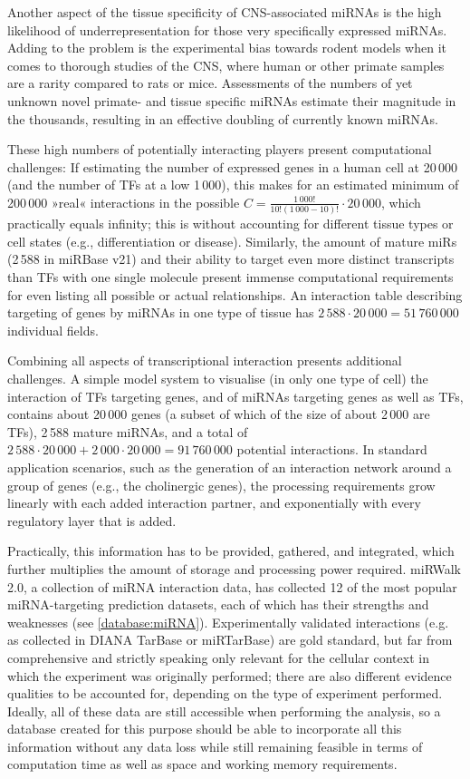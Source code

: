 Another aspect of the tissue specificity of CNS-associated miRNAs is the high likelihood of underrepresentation for those very specifically expressed miRNAs. Adding to the problem is the experimental bias towards rodent models when it comes to thorough studies of the CNS, where human or other primate samples are a rarity compared to rats or mice. Assessments of the numbers of yet unknown novel primate- and tissue specific miRNAs estimate their magnitude in the thousands\cite{Londin2015}, resulting in an effective doubling of currently known miRNAs.

These high numbers of potentially interacting players present computational challenges: If estimating the number of expressed genes in a human cell at 20\,000 (and the number of TFs at a low 1\,000), this makes for an estimated minimum of 200\,000 »real« interactions in the possible $ C = \frac{1\,000!}{10!(1\,000-10)!} \cdot 20\,000 $, which practically equals infinity; this is without accounting for different tissue types or cell states (e.g., differentiation or disease). Similarly, the amount of mature miRs (2\,588 in miRBase v21) and their ability to target even more distinct transcripts than TFs with one single molecule present immense computational requirements for even listing all possible or actual relationships. An interaction table describing targeting of genes by miRNAs in one type of tissue has $ 2\,588 \cdot 20\,000 = 51\,760\,000 $ individual fields.

Combining all aspects of transcriptional interaction presents additional challenges. A simple model system to visualise (in only one type of cell) the interaction of TFs targeting genes, and of miRNAs targeting genes as well as TFs, contains about 20\,000 genes (a subset of which of the size of about 2\,000 are TFs), 2\,588 mature miRNAs, and a total of $ 2\,588 \cdot 20\,000 + 2\,000 \cdot 20\,000 = 91\,760\,000 $ potential interactions. In standard application scenarios, such as the generation of an interaction network around a group of genes (e.g., the cholinergic genes), the processing requirements grow linearly with each added interaction partner, and exponentially with every regulatory layer that is added. 

Practically, this information has to be provided, gathered, and integrated, which further multiplies the amount of storage and processing power required. miRWalk 2.0, a collection of miRNA interaction data, has collected 12 of the most popular miRNA-targeting prediction datasets, each of which has their strengths and weaknesses (see \ref{database:miRNA}). Experimentally validated interactions (e.g. as collected in DIANA TarBase or miRTarBase) are gold standard, but far from comprehensive and strictly speaking only relevant for the cellular context in which the experiment was originally performed; there are also different evidence qualities to be accounted for, depending on the type of experiment performed. Ideally, all of these data are still accessible when performing the analysis, so a database created for this purpose should be able to incorporate all this information without any data loss while still remaining feasible in terms of computation time as well as space and working memory requirements. 


